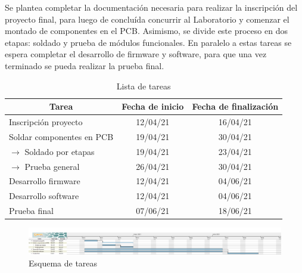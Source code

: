 \documentclass[titlepage, 12pt]{article}
\begin{document}
Se plantea completar la documentación necesaria para realizar la inscripción del proyecto final, para luego de concluída concurrir al Laboratorio y comenzar el montado de componentes en el PCB. Asimismo, se divide este proceso en dos etapas: soldado y prueba de módulos funcionales. En paralelo a estas tareas se espera completar el desarrollo de firmware y software, para que una vez terminado se pueda realizar la prueba final.


\begin{landscape}
    \thispagestyle{empty}

    \null\vfill

    \begin{table}[!hbtp]
        \centering
        \begin{tabular}{@{}lcc@{}}
            \toprule
            \multicolumn{1}{c}{Tarea} & \multicolumn{1}{c}{Fecha de inicio} & \multicolumn{1}{c}{Fecha de finalización} \\ \midrule
            Inscripción proyecto      & 12/04/21                            & 16/04/21                                  \\
            Soldar componentes en PCB & 19/04/21                            & 30/04/21                                  \\
            $\rightarrow$ Soldado por etapas        & 19/04/21                            & 23/04/21                                  \\
            $\rightarrow$ Prueba general            & 26/04/21                            & 30/04/21                                  \\
            Desarrollo firmware       & 12/04/21                            & 04/06/21                                  \\
            Desarrollo software       & 12/04/21                            & 04/06/21                                  \\
            Prueba final              & 07/06/21                            & 18/06/21                                  \\ \bottomrule
        \end{tabular}
        \caption{Lista de tareas}
        \label{tab:tareas}
    \end{table}
    
    \begin{figure}[!hbtp]
        \centering
        \includegraphics[scale=0.3]{proyecto.png}
        \caption{Esquema de tareas}
        \label{fig:gantt}
    \end{figure}
    
    \vfill\null
    \raisebox{-0em}{\makebox[\linewidth]{\thepage}}

\end{landscape}
\end{document}
